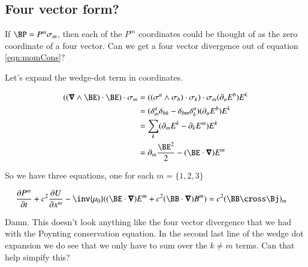 \documentclass{article}
\begin{document}
%
%

\subsection{ Four vector form? }

If $\BP = P^m \sigma_m$, then each of the $P^m$ coordinates could be thought of as the zero coordinate of a four vector.  Can we get a four vector
divergence out of equation \ref{eqn:momCons}?

Let's expand the wedge-dot term in coordinates.

\begin{align*}
( (\spacegrad \wedge \BE ) \cdot \BE ) \cdot \sigma_m
&= ((\sigma^a \wedge \sigma_b) \cdot \sigma_k ) \cdot \sigma_m (\partial_a E^b) E^k \\
&= (\delta^a_m \delta_{bk} - \delta_{bm} \delta^a_k) (\partial_a E^b) E^k \\
&= \sum_k (\partial_m E^k - \partial_k E^m) E^k \\
&= \partial_m \frac{\BE^2}{2} - (\BE \cdot \spacegrad) E^m \\
\end{align*}

So we have three equations, one for each $m = \{1,2,3\}$

\begin{align*}
\PD{t}{P^m} + c^2 \PD{x^m}{U} - \inv{\mu_0}( (\BE \cdot \spacegrad) E^m + c^2 (\BB \cdot \spacegrad) B^m ) &= c^2 (\BB \cross \Bj)_m
\end{align*}

Damn.  This doesn't look anything like the four vector divergence that we had with the Poynting conservation equation.  In the second last line 
of the wedge dot expansion we do see that we only have to sum over the $k \ne m$ terms.  Can that help simpify this?
\end{document}

